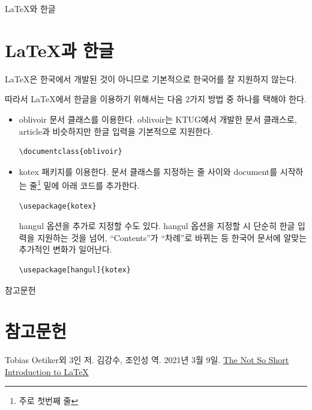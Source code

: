 \documentclass{beamer}
\begin{document}
\begin{frame}{\LaTeX{}와 한글}
    \section{\LaTeX{}과 한글}
    \LaTeX{}은 한국에서 개발된 것이 아니므로 기본적으로 한국어를 잘 지원하지 않는다.

    따라서 \LaTeX{}에서 한글을 이용하기 위해서는 다음 2가지 방법 중 하나를 택해야 한다.

    \begin{itemize}
        \item oblivoir 문서 클래스를 이용한다. oblivoir는 KTUG에서 개발한 문서 클래스로, article과 비슷하지만 한글 입력을 기본적으로 지원한다.
        
        \begin{lstlisting}[numbers=none]
\documentclass{oblivoir}
        \end{lstlisting}

        \item kotex 패키지를 이용한다. 문서 클래스를 지정하는 줄 사이와 document를 시작하는 줄\footnote{주로 첫번째 줄} 밑에 아래 코드를 추가한다.
        \begin{lstlisting}[numbers=none]
\usepackage{kotex}
        \end{lstlisting}

        \framebreak
        hangul 옵션을 추가로 지정할 수도 있다. hangul 옵션을 지정할 시 단순히 한글 입력을 지원하는 것을 넘어, ``Contents''가 ``차례''로 바뀌는 등 한국어 문서에 알맞는 추가적인 변화가 일어난다.
        \begin{lstlisting}[numbers=none]
\usepackage[hangul]{kotex}
        \end{lstlisting}
    \end{itemize}
\end{frame}

\begin{frame}{참고문헌}
    \section{참고문헌}
    \begin{thebibliography}{10}
         Tobias Oetiker외 3인 저. 김강수, 조인성 역. 2021년 3월 9일. \href{https://lab.uklee.pe.kr/tex-archive/info/lshort/korean/lshort-ko.pdf}{The Not So Short Introduction to \LaTeX{}}
    \end{thebibliography}
\end{frame}
\end{document}
